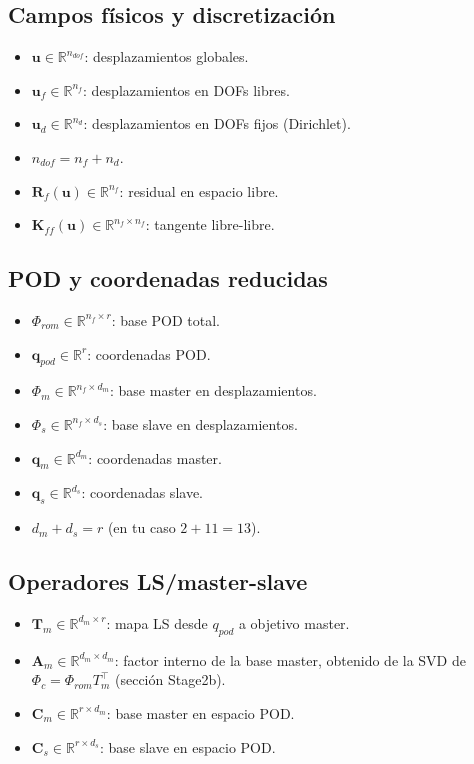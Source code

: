 \documentclass[11pt,a4paper]{article}
\begin{document}
\subsection{Campos físicos y discretización}
\begin{itemize}[leftmargin=1.5em]
\item $\mathbf{u}\in\mathbb{R}^{n_{dof}}$: desplazamientos globales.
\item $\mathbf{u}_f\in\mathbb{R}^{n_f}$: desplazamientos en DOFs libres.
\item $\mathbf{u}_d\in\mathbb{R}^{n_d}$: desplazamientos en DOFs fijos (Dirichlet).
\item $n_{dof}=n_f+n_d$.
\item $\mathbf{R}_f(\mathbf{u})\in\mathbb{R}^{n_f}$: residual en espacio libre.
\item $\mathbf{K}_{ff}(\mathbf{u})\in\mathbb{R}^{n_f\times n_f}$: tangente libre-libre.
\end{itemize}

\subsection{POD y coordenadas reducidas}
\begin{itemize}[leftmargin=1.5em]
\item $\Phi_{rom}\in\mathbb{R}^{n_f\times r}$: base POD total.
\item $\mathbf{q}_{pod}\in\mathbb{R}^{r}$: coordenadas POD.
\item $\Phi_m\in\mathbb{R}^{n_f\times d_m}$: base master en desplazamientos.
\item $\Phi_s\in\mathbb{R}^{n_f\times d_s}$: base slave en desplazamientos.
\item $\mathbf{q}_m\in\mathbb{R}^{d_m}$: coordenadas master.
\item $\mathbf{q}_s\in\mathbb{R}^{d_s}$: coordenadas slave.
\item $d_m+d_s=r$ (en tu caso $2+11=13$).
\end{itemize}

\subsection{Operadores LS/master-slave}
\begin{itemize}[leftmargin=1.5em]
\item $\mathbf{T}_m\in\mathbb{R}^{d_m\times r}$: mapa LS desde $q_{pod}$ a objetivo master.
\item $\mathbf{A}_m\in\mathbb{R}^{d_m\times d_m}$: factor interno de la base master, obtenido de la SVD de $\Phi_c=\Phi_{rom}T_m^\top$ (sección Stage2b).
\item $\mathbf{C}_m\in\mathbb{R}^{r\times d_m}$: base master en espacio POD.
\item $\mathbf{C}_s\in\mathbb{R}^{r\times d_s}$: base slave en espacio POD.
\end{itemize}
\end{document}
